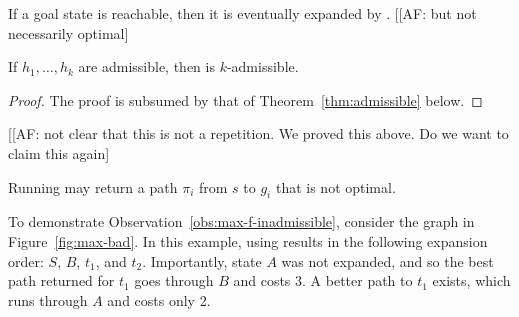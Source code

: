 \begin{lemma}[Completeness]
  \label{lem:completeness}
  If a goal state is reachable, then it is eventually expanded by \kastar. [[AF: but not necessarily optimal]
\end{lemma}

\begin{theorem}
  \label{thm:min-f}
  If $h_1,\dots,h_k$ are admissible, then \kastarmin is $k$-admissible.
\end{theorem}
\begin{proof}
  The proof is subsumed by that of Theorem~\ref{thm:admissible} below.
\end{proof}

[[AF: not clear that this is not a repetition. We proved this above. Do we want to claim this again]

\begin{observation}
  \label{obs:max-f-inadmissible}
  Running \kastarmax may return a path $\pi_i$ from $s$ to $g_i$ that is not optimal.
\end{observation}


To demonstrate Observation~\ref{obs:max-f-inadmissible}, consider the graph in Figure~\ref{fig:max-bad}.
In this example, using \kastarmax results in the following expansion order: $S$, $B$, $t_1$, and $t_2$.
Importantly, state $A$ was not expanded, and so the best path returned for $t_1$ goes through $B$ and costs 3.
A better path to $t_1$ exists, which runs through $A$ and costs only 2.

